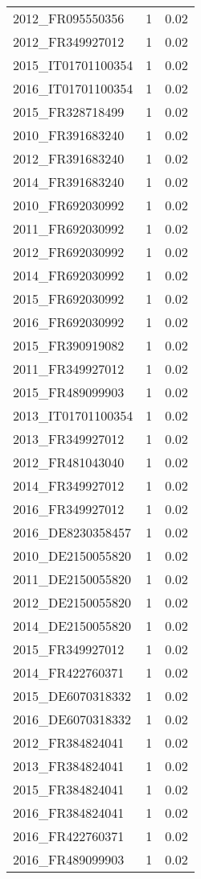 \begin{table*}[htbp]
\begin{tabular}{lrr}
2012_FR095550356 & 1 & 0.02 \\
2012_FR349927012 & 1 & 0.02 \\
2015_IT01701100354 & 1 & 0.02 \\
2016_IT01701100354 & 1 & 0.02 \\
2015_FR328718499 & 1 & 0.02 \\
2010_FR391683240 & 1 & 0.02 \\
2012_FR391683240 & 1 & 0.02 \\
2014_FR391683240 & 1 & 0.02 \\
2010_FR692030992 & 1 & 0.02 \\
2011_FR692030992 & 1 & 0.02 \\
2012_FR692030992 & 1 & 0.02 \\
2014_FR692030992 & 1 & 0.02 \\
2015_FR692030992 & 1 & 0.02 \\
2016_FR692030992 & 1 & 0.02 \\
2015_FR390919082 & 1 & 0.02 \\
2011_FR349927012 & 1 & 0.02 \\
2015_FR489099903 & 1 & 0.02 \\
2013_IT01701100354 & 1 & 0.02 \\
2013_FR349927012 & 1 & 0.02 \\
2012_FR481043040 & 1 & 0.02 \\
2014_FR349927012 & 1 & 0.02 \\
2016_FR349927012 & 1 & 0.02 \\
2016_DE8230358457 & 1 & 0.02 \\
2010_DE2150055820 & 1 & 0.02 \\
2011_DE2150055820 & 1 & 0.02 \\
2012_DE2150055820 & 1 & 0.02 \\
2014_DE2150055820 & 1 & 0.02 \\
2015_FR349927012 & 1 & 0.02 \\
2014_FR422760371 & 1 & 0.02 \\
2015_DE6070318332 & 1 & 0.02 \\
2016_DE6070318332 & 1 & 0.02 \\
2012_FR384824041 & 1 & 0.02 \\
2013_FR384824041 & 1 & 0.02 \\
2015_FR384824041 & 1 & 0.02 \\
2016_FR384824041 & 1 & 0.02 \\
2016_FR422760371 & 1 & 0.02 \\
2016_FR489099903 & 1 & 0.02 \\

\end{tabular}
\end{table*}
